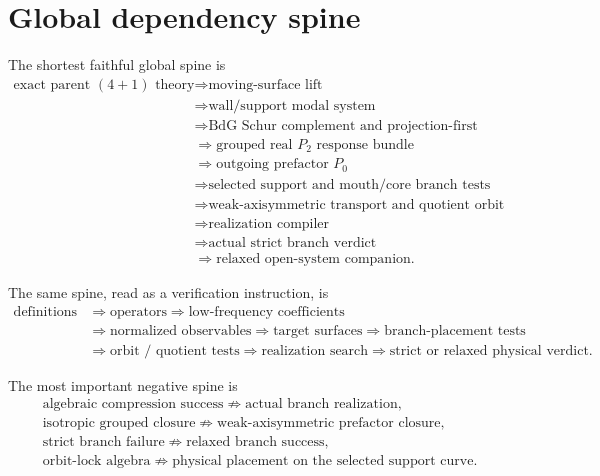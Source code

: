 \section{Global dependency spine}
\label{sec:global-dependency-spine}

The shortest faithful global spine is
\[
\begin{aligned}
\text{exact parent }(4+1)\text{ theory}
&\Longrightarrow
\text{moving-surface lift}
\\[0.35em]
&\Longrightarrow
\text{wall/support modal system}
\\[0.35em]
&\Longrightarrow
\text{BdG Schur complement and projection-first Maxwell packet}
\\[0.35em]
&\Longrightarrow
\text{grouped real }P_2\text{ response bundle}
\\[0.35em]
&\Longrightarrow
\text{outgoing prefactor }P_0
\\[0.35em]
&\Longrightarrow
\text{selected support and mouth/core branch tests}
\\[0.35em]
&\Longrightarrow
\text{weak-axisymmetric transport and quotient orbit}
\\[0.35em]
&\Longrightarrow
\text{realization compiler}
\\[0.35em]
&\Longrightarrow
\text{actual strict branch verdict}
\\[0.35em]
&\Longrightarrow
\text{relaxed open-system companion}.
\end{aligned}
\]

The same spine, read as a verification instruction, is
\[
\begin{aligned}
\text{definitions}
&\Longrightarrow
\text{operators}
\Longrightarrow
\text{low-frequency coefficients}
\\[0.35em]
&\Longrightarrow
\text{normalized observables}
\Longrightarrow
\text{target surfaces}
\Longrightarrow
\text{branch-placement tests}
\\[0.35em]
&\Longrightarrow
\text{orbit / quotient tests}
\Longrightarrow
\text{realization search}
\Longrightarrow
\text{strict or relaxed physical verdict}.
\end{aligned}
\]

The most important negative spine is
\[
\begin{gathered}
\text{algebraic compression success}
\not\Rightarrow
\text{actual branch realization},
\\[0.35em]
\text{isotropic grouped closure}
\not\Rightarrow
\text{weak-axisymmetric prefactor closure},
\\[0.35em]
\text{strict branch failure}
\not\Rightarrow
\text{relaxed branch success},
\\[0.35em]
\text{orbit-lock algebra}
\not\Rightarrow
\text{physical placement on the selected support curve}.
\end{gathered}
\]

